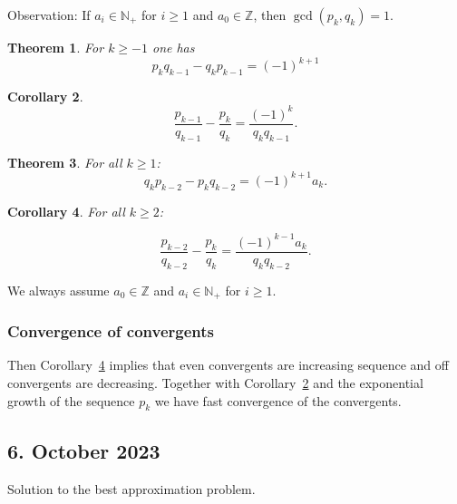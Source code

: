 \documentclass[a4paper,11pt,american]{article}
\theoremstyle{plain}
\newtheorem{theorem}{Theorem}
\newtheorem{corollary}[theorem]{Corollary}
\theoremstyle{definition}
\begin{document}
Observation: If $a_i ∈ℕ_+$ for $i≥1$ and $a_0 ∈ℤ$, then $\gcd(p_k,q_k) = 1$.


\begin{theorem}
  \label{thr:3}
  For $k≥ -1$ one has
  \begin{displaymath}
    p_k q_{k-1} - q_k p_{k-1} = (-1)^{k+1} 
  \end{displaymath}
\end{theorem}

\begin{corollary}
  \label{co:1}
  \begin{equation}
    \label{eq:4}
      \frac{p_{k-1}}{q_{k-1}} - \frac{p_k}{q_k} = \frac{(-1)^k }{q_k q_{k-1}}.    
  \end{equation}

\end{corollary}

\begin{theorem}
  For all $k≥1$:
  \begin{displaymath}
    q_k p_{k-2} - p_k q_{k-2} = (-1)^ {k+1} a_k. 
  \end{displaymath}
\end{theorem}


\begin{corollary}
  \label{co:2}
  For all $k≥ 2$:

  \begin{displaymath}
    \frac{p_{k-2}}{q_{k-2}} -    \frac{p_k}{q_k} = \frac{(-1)^{k-1} a_k}{q_k q_{k-2}}. 
  \end{displaymath}
\end{corollary}

We always assume $a_0∈ℤ$ and $a_i ∈ ℕ_+$ for $i≥1$.





\subsubsection*{Convergence of convergents}

Then Corollary~\ref{co:2} implies that even convergents are increasing sequence and off convergents are decreasing. Together with Corollary~\ref{co:1} and the exponential growth of the sequence $p_k$ we have fast convergence of the convergents.



\subsection*{6. October 2023}
Solution to the best approximation problem.
\end{document}
